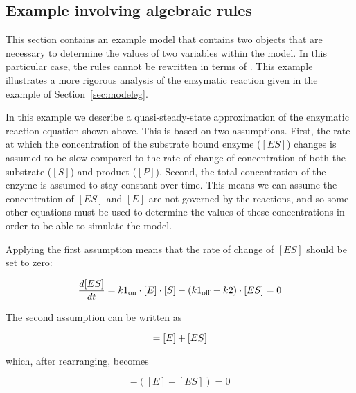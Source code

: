 \subsection{Example involving algebraic rules}
\label{sec:algeraiceg}

This section contains an example model that contains two
\AlgebraicRule objects that are necessary to determine the values
of two variables within the model.  In this particular case, the
rules cannot be rewritten in terms of \AssignmentRule.  This
example illustrates a more rigorous analysis of the enzymatic
reaction given in the example of Section~\ref{sec:modeleg}.
\begin{center}
\end{center}
In this example we describe a quasi-steady-state approximation of
the enzymatic reaction equation shown above.  This is based on two
assumptions.  First, the rate at which the concentration of the
substrate bound enzyme ($[ES]$) changes is assumed to be slow
compared to the rate of change of concentration of both the
substrate ($[S]$) and product ($[P]$).  Second, the total
concentration of the enzyme is assumed to stay constant over time.
This means we can assume the concentration of $[ES]$ and $[E]$ are
not governed by the reactions, and so some other equations must be
used to determine the values of these concentrations in order to
be able to simulate the model.

Applying the first assumption means that the rate of change of
$[ES]$ should be set to zero:
\begin{linenomath}
\begin{equation*}
  \dfrac{d [ES]}{d t} = k1\sub{on} \cdot [E] \cdot [S] - (k1\sub{off} + k2) \cdot [ES] = 0
\end{equation*}
\end{linenomath}

The second assumption can be written as
\begin{linenomath}
\begin{equation*}
  [E\sub{total}] = [E] + [ES]\\[6pt]
\end{equation*}
\end{linenomath}
which, after rearranging, becomes
\begin{linenomath}
\begin{equation*}
  [E\sub{total}] - ([E] + [ES]) = 0
\end{equation*}
\end{linenomath}

